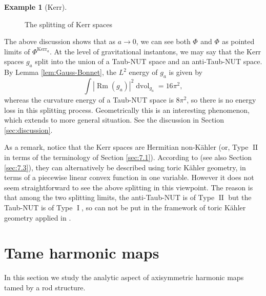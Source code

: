 \documentclass[a4paper,11pt]{amsart}
\theoremstyle{definition}
\newtheorem{example}[theorem]{Example}
\numberwithin{equation}{section}
\DeclareMathOperator{\dvol}{dvol}
\DeclareMathOperator{\Rm}{Rm}
\DeclareMathOperator{\I}{I}
\DeclareMathOperator{\II}{II}
\DeclareMathOperator{\TNp}{TN^+}
\DeclareMathOperator{\TNm}{TN^{--}}
\DeclareMathOperator{\Kerr}{Kerr}
\begin{document}
\begin{example}[Kerr]
\begin{figure}[ht]
	\caption{The splitting of Kerr spaces}
	 \label{Figure:splitting of kerr}   
\end{figure}




The above discussion shows that as $a\rightarrow 0$, we can see both $\Phi^{\TNp}$ and $\Phi^{\TNm}$ as pointed limits of $\Phi^{\Kerr_a}$. At the level of gravitational instantons, we may say that the Kerr spaces $g_a$ split into the union of a Taub-NUT space and an anti-Taub-NUT space. By Lemma \ref{lem:Gauss-Bonnet}, the $L^2$ energy of $g_a$ is given by
$$\int|\Rm(g_a)|^2\dvol_{g_a}=16\pi^2,$$ whereas the curvature energy of a Taub-NUT space is $8\pi^2$, so there is no energy loss in this splitting process. Geometrically this is an interesting phenomenon, which extends to  more general situation. See the discussion in Section \ref{sec:discussion}.

As a remark, notice that the Kerr spaces are Hermitian non-K\"ahler (or, Type $\II$ in terms of the terminology of Section \ref{sec:7.1}). According to \cite{BG} (see also Section \ref{sec:7.3}), they can alternatively be  described using toric K\"ahler geometry, in terms of a piecewise linear convex function in one variable.  However it does not seem straightforward to see the above splitting in this viewpoint. The reason is that among the two splitting limits, the anti-Taub-NUT is of Type $\II$ but the Taub-NUT is  of Type $\I$, so can not be put in the framework of toric K\"ahler geometry applied in \cite{BG}. 
\end{example}



\section{Tame harmonic  maps}
\label{sec:harmonic maps}
 

In this section we study the analytic aspect of axisymmetric harmonic maps tamed by a rod structure. 
\end{document}
